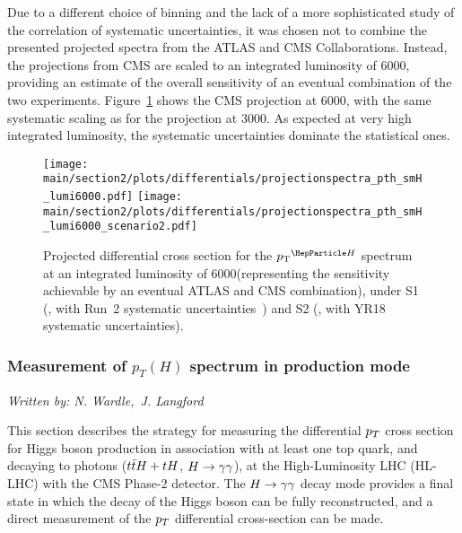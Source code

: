 Due to a different choice of binning and the lack of a more sophisticated study of the correlation of systematic uncertainties, it was chosen not to combine the presented projected spectra from the ATLAS and CMS Collaborations.
% 
Instead, the projections from CMS are scaled to an integrated luminosity of 6000\fbinv, providing an estimate of the overall sensitivity of an eventual combination of the two experiments.
% 
Figure~\ref{fig:proj_pth_6000} shows the CMS projection at 6000\fbinv, with the same systematic scaling as for the projection at 3000\fbinv.
% 
As expected at very high integrated luminosity, the systematic uncertainties dominate the statistical ones.

\begin{figure}%
  \begin{center}
\texttt{[image: \\main/section2/plots/differentials/projectionspectra\_pth\_smH\_lumi6000.pdf]}
\texttt{[image: \\main/section2/plots/differentials/projectionspectra\_pth\_smH\_lumi6000\_scenario2.pdf]}
    \caption{
        Projected differential cross section for the $\pTH$ spectrum at an integrated luminosity of 6000\fbinv (representing the sensitivity achievable by an eventual ATLAS and CMS combination), under S1 (\UcmsLeft, with Run~2 systematic uncertainties~\cite{CMS-PAS-HIG-17-028}) and S2 (\UcmsRight, with YR18 systematic uncertainties).
        }
    \label{fig:proj_pth_6000}
  \end{center}
\end{figure}

\subsubsection{Measurement of $p_{T}(H)$ spectrum  in \ttH production mode}
\label{sec:ttHdiffxs}

\begin{center}{\it Written by: N. Wardle,~J. Langford} \end{center}

This section describes the strategy for measuring the differential $p_{T}$ cross section for 
Higgs boson production in association with at least one top quark, and decaying to photons ($t\bar{t}H+tH$, $H\rightarrow\gamma\gamma$), 
at the High-Luminosity LHC (HL-LHC) with the CMS Phase-2 detector. The $H\rightarrow\gamma\gamma$ decay mode provides a final state in which the decay of the Higgs boson can be fully reconstructed, and a direct measurement of the $p_{T}$ differential cross-section can be made. 

